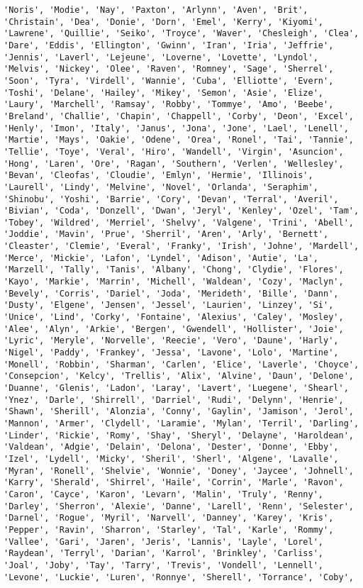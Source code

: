 \documentclass[11pt]{article}
\begin{document}
\begin{Verbatim}[commandchars=\\\{\}]
'Noris', 'Modie', 'Nay', 'Paxton', 'Arlynn', 'Aven', 'Brit', 'Christain', 'Dea', 'Donie', 'Dorn', 'Emel', 'Kerry', 'Kiyomi', 'Lawrene', 'Quillie', 'Seiko', 'Troyce', 'Waver', 'Chesleigh', 'Clea', 'Dare', 'Eddis', 'Ellington', 'Gwinn', 'Iran', 'Iria', 'Jeffrie', 'Jennis', 'Laverl', 'Lejeune', 'Loverne', 'Lovette', 'Lyndol', 'Melvis', 'Nickey', 'Olee', 'Raven', 'Romney', 'Sage', 'Sherrel', 'Soon', 'Tyra', 'Virdell', 'Wannie', 'Cuba', 'Elliotte', 'Evern', 'Toshi', 'Delane', 'Hailey', 'Mikey', 'Semon', 'Asie', 'Elize', 'Laury', 'Marchell', 'Ramsay', 'Robby', 'Tommye', 'Amo', 'Beebe', 'Breland', 'Challie', 'Chapin', 'Chappell', 'Corby', 'Deon', 'Excel', 'Henly', 'Imon', 'Italy', 'Janus', 'Jona', 'Jone', 'Lael', 'Lenell', 'Martie', 'Mays', 'Oakie', 'Odene', 'Orea', 'Ronel', 'Tai', 'Tannie', 'Tellie', 'Toye', 'Veral', 'Hiro', 'Wandell', 'Virgin', 'Asuncion', 'Hong', 'Laren', 'Ore', 'Ragan', 'Southern', 'Verlen', 'Wellesley', 'Bevan', 'Cleofas', 'Cloudie', 'Emlyn', 'Hermie', 'Illinois', 'Laurell', 'Lindy', 'Melvine', 'Novel', 'Orlanda', 'Seraphim', 'Shinobu', 'Yoshi', 'Barrie', 'Cory', 'Devan', 'Terral', 'Averil', 'Bivian', 'Coda', 'Donzell', 'Dwan', 'Jeryl', 'Kenley', 'Ozel', 'Tam', 'Tobey', 'Wildred', 'Merriel', 'Shelvy', 'Valgene', 'Trini', 'Abell', 'Joddie', 'Mavin', 'Prue', 'Sherril', 'Aren', 'Arly', 'Bernett', 'Cleaster', 'Clemie', 'Everal', 'Franky', 'Irish', 'Johne', 'Mardell', 'Merce', 'Mickie', 'Lafon', 'Lyndel', 'Adison', 'Autie', 'La', 'Marzell', 'Tally', 'Tanis', 'Albany', 'Chong', 'Clydie', 'Flores', 'Kayo', 'Markie', 'Marrin', 'Michell', 'Waldean', 'Cozy', 'Maclyn', 'Bevely', 'Corris', 'Dariel', 'Joda', 'Merideth', 'Bille', 'Dann', 'Dusty', 'Elgene', 'Jensen', 'Jessel', 'Laurien', 'Linzey', 'Si', 'Unice', 'Lind', 'Corky', 'Fontaine', 'Alexius', 'Caley', 'Mosley', 'Alee', 'Alyn', 'Arkie', 'Bergen', 'Gwendell', 'Hollister', 'Joie', 'Lyric', 'Meryle', 'Norvelle', 'Reecie', 'Vero', 'Daune', 'Harly', 'Nigel', 'Paddy', 'Frankey', 'Jessa', 'Lavone', 'Lolo', 'Martine', 'Monell', 'Robbin', 'Sharman', 'Carlen', 'Elice', 'Laverle', 'Choyce', 'Consepcion', 'Kelcy', 'Trellis', 'Alix', 'Alvine', 'Daun', 'Delone', 'Duanne', 'Glenis', 'Ladon', 'Laray', 'Lavert', 'Luegene', 'Shearl', 'Ynez', 'Darle', 'Shirrell', 'Darriel', 'Rudi', 'Delynn', 'Henrie', 'Shawn', 'Sherill', 'Alonzia', 'Conny', 'Gaylin', 'Jamison', 'Jerol', 'Mannon', 'Armer', 'Clydell', 'Laramie', 'Mylan', 'Terril', 'Darling', 'Linder', 'Rickie', 'Romy', 'Shay', 'Sheryl', 'Delayne', 'Haroldean', 'Valdean', 'Adgie', 'Delain', 'Delona', 'Dester', 'Donne', 'Ebby', 'Izel', 'Lydell', 'Micky', 'Sheril', 'Sherl', 'Algene', 'Lavalle', 'Myran', 'Ronell', 'Shelvie', 'Wonnie', 'Doney', 'Jaycee', 'Johnell', 'Karry', 'Sherald', 'Shirrel', 'Haile', 'Corrin', 'Marle', 'Ravon', 'Caron', 'Cayce', 'Karon', 'Levarn', 'Malin', 'Truly', 'Renny', 'Darley', 'Sherron', 'Alexie', 'Danne', 'Larell', 'Renn', 'Selester', 'Darnel', 'Rogue', 'Myril', 'Narvell', 'Danney', 'Karey', 'Kris', 'Pepper', 'Ravin', 'Sharron', 'Starley', 'Tal', 'Karle', 'Rommy', 'Vallee', 'Gari', 'Jaren', 'Jeris', 'Lannis', 'Layle', 'Lorel', 'Raydean', 'Terryl', 'Darian', 'Karrol', 'Brinkley', 'Carliss', 'Joal', 'Joby', 'Tay', 'Tarry', 'Trevis', 'Vondell', 'Lennell', 'Levone', 'Luckie', 'Luren', 'Ronnye', 'Sherell', 'Torrance', 'Coby', 
\end{Verbatim}
\end{document}
